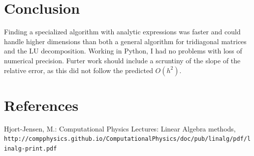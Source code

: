 \documentclass{article}
\begin{document}
\section{Conclusion}
Finding a specialized algorithm with analytic expressions was faster and could handle higher dimensions than both a general algorithm for tridiagonal matrices and the LU decomposition. Working in Python, I had no problems with loss of numerical precision. Furter work should include a scruntiny of the slope of the relative error, as this did not follow the predicted $O(h^2)$.
\section{References}

\begin{thebibliography}{1}
Hjort-Jensen, M.: Computational Physics Lectures: Linear
Algebra methods,
\\\texttt{http://compphysics.github.io/ComputationalPhysics/doc/pub/linalg/pdf/linalg-print.pdf}
\end{thebibliography}
\end{document}
